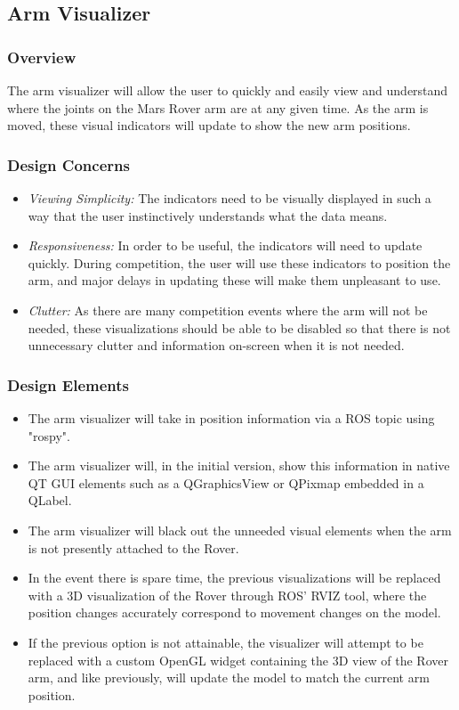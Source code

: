 \subsection{Arm Visualizer}
\subsubsection{Overview}
The arm visualizer will allow the user to quickly and easily view and understand where the joints on the Mars Rover arm are at any given time.
As the arm is moved, these visual indicators will update to show the new arm positions.

\subsubsection{Design Concerns}
\begin{itemize}
\item \textit{Viewing Simplicity:} The indicators need to be visually displayed in such a way that the user instinctively understands what the data means.
\item \textit{Responsiveness:} In order to be useful, the indicators will need to update quickly.
During competition, the user will use these indicators to position the arm, and major delays in updating these will make them unpleasant to use.
\item \textit{Clutter:} As there are many competition events where the arm will not be needed, these visualizations should be able to be disabled so that there is not unnecessary clutter and information on-screen when it is not needed.
\end{itemize}

\subsubsection{Design Elements}
\begin{itemize}
\item The arm visualizer will take in position information via a ROS topic using "rospy".
\item The arm visualizer will, in the initial version, show this information in native QT GUI elements such as a QGraphicsView or QPixmap embedded in a QLabel.
\item The arm visualizer will black out the unneeded visual elements when the arm is not presently attached to the Rover.
\item In the event there is spare time, the previous visualizations will be replaced with a 3D visualization of the Rover through ROS' RVIZ tool, where the position changes accurately correspond to movement changes on the model. 
\item If the previous option is not attainable, the visualizer will attempt to be replaced with a custom OpenGL widget containing the 3D view of the Rover arm, and like previously, will update the model to match the current arm position.
\end{itemize}

